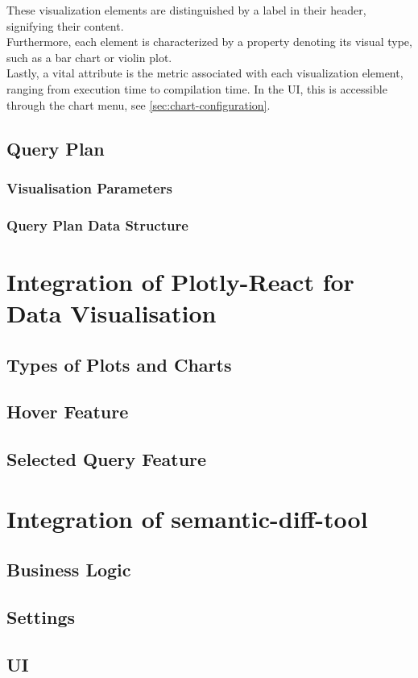 These visualization elements are distinguished by a label in their header, signifying their content.\\
Furthermore, each element is characterized by a property denoting its visual type, such as a bar chart or violin plot.\\
Lastly, a vital attribute is the metric associated with each visualization element, ranging from execution time to compilation time. In the UI, this is accessible through the chart menu, see \ref{sec:chart-configuration}.










\subsection{Query Plan}
\subsubsection{Visualisation Parameters}\label{sec:query-plan-parameters}
\subsubsection{Query Plan Data Structure}\label{sec:query-plan-structure}















\section{Integration of Plotly-React for Data Visualisation}
\subsection{Types of Plots and Charts}
\subsection{Hover Feature}
\subsection{Selected Query Feature}

\section{Integration of semantic-diff-tool}\label{sec:semantic-diff-integration}
\subsection{Business Logic}
\subsection{Settings}
\subsection{UI}